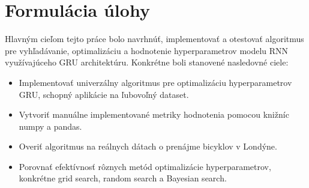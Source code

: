 \section{Formulácia úlohy}
Hlavným cieľom tejto práce bolo navrhnúť, implementovať a otestovať algoritmus pre vyhľadávanie, optimalizáciu a hodnotenie hyperparametrov modelu RNN využívajúceho GRU architektúru. Konkrétne boli stanovené nasledovné ciele:

\begin{itemize}
\item Implementovať univerzálny algoritmus pre optimalizáciu hyperparametrov GRU, schopný aplikácie na ľubovoľný dataset.
\item Vytvoriť manuálne implementované metriky hodnotenia pomocou knižníc numpy a pandas.
\item Overiť algoritmus na reálnych dátach o prenájme bicyklov v Londýne.
\item Porovnať efektívnosť rôznych metód optimalizácie hyperparametrov, konkrétne grid search, random search a Bayesian search.
\end{itemize}